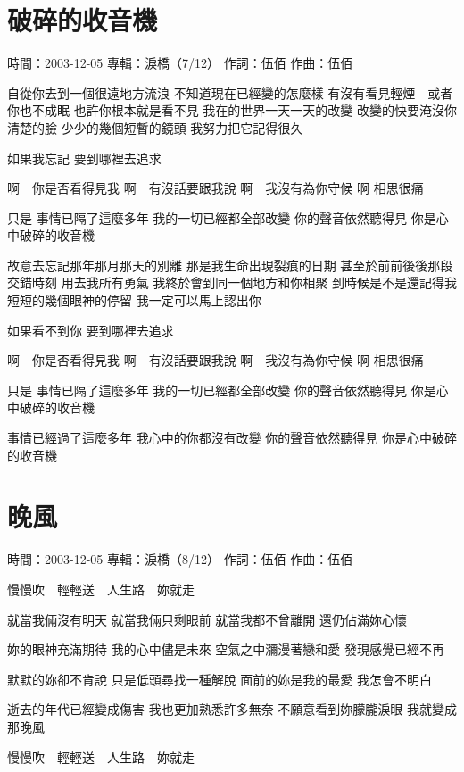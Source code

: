\documentclass[UTF8,a4paper,oneside,twocolumn,12pt]{ctexbook}
\newcommand{\infopair}[2]{\textbullet #1：#2}
\newcommand{\zc}[1][伍佰]{\infopair{作詞}{#1}}
\newcommand{\zq}[1][伍佰]{\infopair{作曲}{#1}}
\newcommand{\zj}[1]{\infopair{專輯}{#1}}
\newcommand{\sj}[1]{\infopair{時間}{#1}}
\newenvironment{info}{\begin{flushleft}\kaishu
	}
	{\end{flushleft}\normalsize\yahei\par}
\newenvironment{lyric}{
	}
{}
\begin{document}
\section{破碎的收音機}
\begin{info}
	\sj{2003-12-05}
	\zj{淚橋（7/12）}
	\zc
	\zq
\end{info}
\begin{lyric}
	自從你去到一個很遠地方流浪
	不知道現在已經變的怎麼樣
	有沒有看見輕煙　或者你也不成眠
	也許你根本就是看不見
	我在的世界一天一天的改變
	改變的快要淹沒你清楚的臉
	少少的幾個短暫的鏡頭
	我努力把它記得很久

	如果我忘記 要到哪裡去追求

	啊　你是否看得見我
	啊　有沒話要跟我說
	啊　我沒有為你守候
	啊 相思很痛

	只是
	事情已隔了這麼多年
	我的一切已經都全部改變
	你的聲音依然聽得見
	你是心中破碎的收音機

	故意去忘記那年那月那天的別離
	那是我生命出現裂痕的日期
	甚至於前前後後那段交錯時刻
	用去我所有勇氣
	我終於會到同一個地方和你相聚
	到時候是不是還記得我
	短短的幾個眼神的停留
	我一定可以馬上認出你

	如果看不到你 要到哪裡去追求

	啊　你是否看得見我
	啊　有沒話要跟我說
	啊　我沒有為你守候
	啊 相思很痛

	只是
	事情已隔了這麼多年
	我的一切已經都全部改變
	你的聲音依然聽得見
	你是心中破碎的收音機

	事情已經過了這麼多年
	我心中的你都沒有改變
	你的聲音依然聽得見
	你是心中破碎的收音機
\end{lyric}

\section{晚風}
\begin{info}
	\sj{2003-12-05}
	\zj{淚橋（8/12）}
	\zc
	\zq
\end{info}
\begin{lyric}
	慢慢吹　輕輕送　人生路　妳就走

	就當我倆沒有明天
	就當我倆只剩眼前
	就當我都不曾離開
	還仍佔滿妳心懷

	妳的眼神充滿期待
	我的心中儘是未來
	空氣之中瀰漫著戀和愛
	發現感覺已經不再

	默默的妳卻不肯說
	只是低頭尋找一種解脫
	面前的妳是我的最愛
	我怎會不明白

	逝去的年代已經變成傷害
	我也更加熟悉許多無奈
	不願意看到妳朦朧淚眼
	我就變成那晚風

	慢慢吹　輕輕送　人生路　妳就走
\end{lyric}
\end{document}
